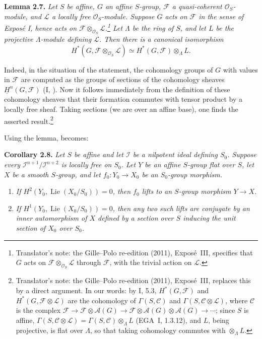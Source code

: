 \medskip
\noindent{}\textbf{Lemma 2.7.}
\textit{Let \(S\) be affine, \(G\) an affine \(S\)-group,
\(\mathscr F\) a quasi-coherent \(\mathscr O_S\)-module, and
\(\mathscr L\) a locally free \(\mathscr O_S\)-module. Suppose \(G\)
acts on \(\mathscr F\) in the sense of Expos\'e I, hence acts on
\(\mathscr F\otimes_{\mathscr O_S}\mathscr L\).\footnote{Translator's note: the Gille--Polo re-edition (2011), Exposé~III, specifies
that \(G\) acts on \(\mathscr F\otimes_{\mathscr O_S}\mathscr L\) through
\(\mathscr F\), with the trivial action on \(\mathscr L\).} Let \(\Lambda\) be
the ring of \(S\), and let \(L\) be the projective \(\Lambda\)-module
defining \(\mathscr L\). Then there is a canonical isomorphism}
\[
 H^*(G,\mathscr F\otimes_{\mathscr O_S}\mathscr L)
 \simeq H^*(G,\mathscr F)\otimes_\Lambda L.
\]

Indeed, in the situation of the statement, the cohomology groups of \(G\)
with values in \(\mathscr F\) are computed as the groups of sections of the
cohomology sheaves \(\underline H^n(G,\mathscr F)\) (I, ). Now it follows
immediately from the definition of these cohomology sheaves that their
formation commutes with tensor product by a locally free sheaf. Taking
sections (we are over an affine base), one finds the asserted
result.\footnote{Translator's note: the Gille--Polo re-edition (2011), Exposé~III, replaces this by a direct argument. In our
words: by I, 5.3, \(H^*(G,\mathscr F)\) and
\(H^*(G,\mathscr F\otimes\mathscr L)\) are the cohomology of
\(\Gamma(S,\mathscr C)\) and \(\Gamma(S,\mathscr C\otimes\mathscr L)\), where
\(\mathscr C\) is the complex \(\mathscr F\to\mathscr F\otimes\mathscr A(G)
\to\mathscr F\otimes\mathscr A(G)\otimes\mathscr A(G)\to\cdots\); since \(S\) is
affine, \(\Gamma(S,\mathscr C\otimes\mathscr L)=\Gamma(S,\mathscr C)
\otimes_\Lambda L\) (EGA~I, 1.3.12), and \(L\), being projective, is flat over
\(\Lambda\), so that taking cohomology commutes with \(\otimes_\Lambda L\).}

Using the lemma,  becomes:

\medskip
\noindent{}\textbf{Corollary 2.8.}
\textit{Let \(S\) be affine and let \(\mathscr I\) be a nilpotent
ideal defining \(S_0\). Suppose every
\(\mathscr I^{n+1}/\mathscr I^{n+2}\) is locally free on \(S_0\). Let
\(Y\) be an affine \(S\)-group flat over \(S\), let \(X\) be a smooth
\(S\)-group, and let \(f_0:Y_0\to X_0\) be an \(S_0\)-group morphism.}
\begin{enumerate}
\item[\(i\)] \textit{If
\(H^2(Y_0,\operatorname{Lie}(X_0/S_0))=0\), then \(f_0\) lifts to an
\(S\)-group morphism \(Y\to X\).}
\item[\SGAInlineRefTarget{sga3:iii:corollary:2-8:item:ii}(ii)] \textit{If
\(H^1(Y_0,\operatorname{Lie}(X_0/S_0))=0\), then any two such lifts are
conjugate by an inner automorphism of \(X\) defined by a section over
\(S\) inducing the unit section of \(X_0\) over \(S_0\).}
\end{enumerate}

